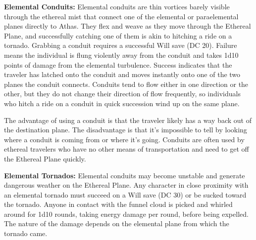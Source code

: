 \textbf{Elemental Conduits:} Elemental conduits are thin vortices barely visible through the ethereal mist that connect one of the elemental or paraelemental planes directly to Athas. They flex and weave as they move through the Ethereal Plane, and successfully catching one of them is akin to hitching a ride on a tornado. Grabbing a conduit requires a successful Will save (DC 20). Failure means the individual is flung violently away from the conduit and takes 1d10 points of damage from the elemental turbulence. Success indicates that the traveler has latched onto the conduit and moves instantly onto one of the two planes the conduit connects. Conduits tend to flow either in one direction or the other, but they do not change their direction of flow frequently, so individuals who hitch a ride on a conduit in quick succession wind up on the same plane.

The advantage of using a conduit is that the traveler likely has a way back out of the destination plane. The disadvantage is that it's impossible to tell by looking where a conduit is coming from or where it's going. Conduits are often used by ethereal travelers who have no other means of transportation and need to get off the Ethereal Plane quickly.

\textbf{Elemental Tornados:} Elemental conduits may become unstable and generate dangerous weather on the Ethereal Plane. Any character in close proximity with an elemental tornado must succeed on a Will save (DC 30) or be sucked toward the tornado. Anyone in contact with the funnel cloud is picked and whirled around for 1d10 rounds, taking energy damage per round, before being expelled. The nature of the damage depends on the elemental plane from which the tornado came.

